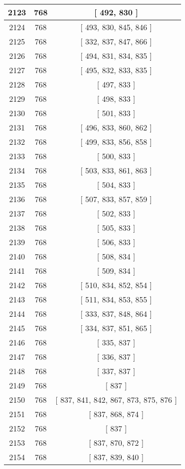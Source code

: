 \begin{center}
\begin{longtable}[H]{|| c c c ||}
\hline
2123 & 768 & [ 492, 830 ] \\ 
\hline
2124 & 768 & [ 493, 830, 845, 846 ] \\ 
\hline
2125 & 768 & [ 332, 837, 847, 866 ] \\ 
\hline
2126 & 768 & [ 494, 831, 834, 835 ] \\ 
\hline
2127 & 768 & [ 495, 832, 833, 835 ] \\ 
\hline
2128 & 768 & [ 497, 833 ] \\ 
\hline
2129 & 768 & [ 498, 833 ] \\ 
\hline
2130 & 768 & [ 501, 833 ] \\ 
\hline
2131 & 768 & [ 496, 833, 860, 862 ] \\ 
\hline
2132 & 768 & [ 499, 833, 856, 858 ] \\ 
\hline
2133 & 768 & [ 500, 833 ] \\ 
\hline
2134 & 768 & [ 503, 833, 861, 863 ] \\ 
\hline
2135 & 768 & [ 504, 833 ] \\ 
\hline
2136 & 768 & [ 507, 833, 857, 859 ] \\ 
\hline
2137 & 768 & [ 502, 833 ] \\ 
\hline
2138 & 768 & [ 505, 833 ] \\ 
\hline
2139 & 768 & [ 506, 833 ] \\ 
\hline
2140 & 768 & [ 508, 834 ] \\ 
\hline
2141 & 768 & [ 509, 834 ] \\ 
\hline
2142 & 768 & [ 510, 834, 852, 854 ] \\ 
\hline
2143 & 768 & [ 511, 834, 853, 855 ] \\ 
\hline
2144 & 768 & [ 333, 837, 848, 864 ] \\ 
\hline
2145 & 768 & [ 334, 837, 851, 865 ] \\ 
\hline
2146 & 768 & [ 335, 837 ] \\ 
\hline
2147 & 768 & [ 336, 837 ] \\ 
\hline
2148 & 768 & [ 337, 837 ] \\ 
\hline
2149 & 768 & [ 837 ] \\ 
\hline
2150 & 768 & [ 837, 841, 842, 867, 873, 875, 876 ] \\ 
\hline
2151 & 768 & [ 837, 868, 874 ] \\ 
\hline
2152 & 768 & [ 837 ] \\ 
\hline
2153 & 768 & [ 837, 870, 872 ] \\ 
\hline
2154 & 768 & [ 837, 839, 840 ] \\ 

\end{longtable}
\end{center}
